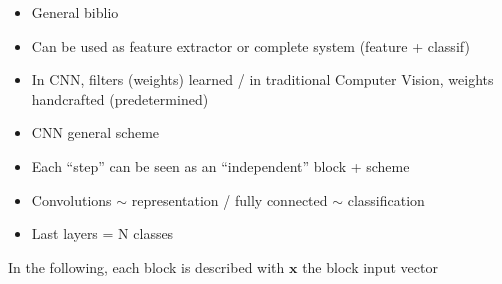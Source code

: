 \label{intro}

\begin{itemize}
 \item General biblio
 \item Can be used as feature extractor or complete system (feature + classif)
 \item In CNN, filters (weights) learned / in traditional Computer Vision, weights handcrafted (predetermined)
 \item CNN general scheme
 \item Each ``step'' can be seen as an ``independent'' block + scheme 
 \item Convolutions $\sim$ representation / fully connected $\sim$ classification
 \item Last layers = N classes
\end{itemize}

In the following, each block is described with $\mathbf{x}$ the block input vector